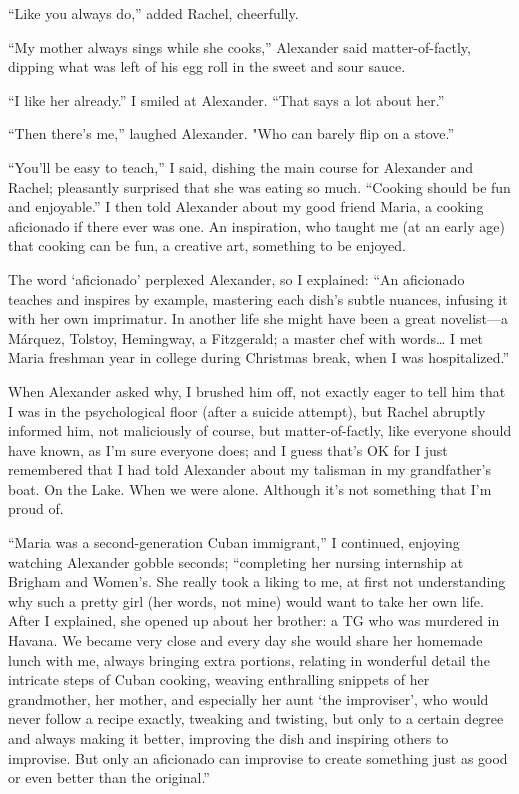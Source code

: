 ``Like you always do,'' added Rachel, cheerfully.

``My mother always sings while she cooks,'' Alexander said
matter-of-factly, dipping what was left of his egg roll in the sweet and
sour sauce.

``I like her already.'' I smiled at Alexander. ``That says a lot about
her.''

``Then there's me,'' laughed Alexander. "Who can barely flip on a
stove.''

``You'll be easy to teach,'' I said, dishing the main course for
Alexander and Rachel; pleasantly surprised that she was eating so much.
``Cooking should be fun and enjoyable.'' I then told Alexander about my
good friend Maria, a cooking aficionado if there ever was one. An
inspiration, who taught me (at an early age) that cooking can be fun, a
creative art, something to be enjoyed.

The word `aficionado' perplexed Alexander, so I explained: ``An
aficionado teaches and inspires by example, mastering each dish's subtle
nuances, infusing it with her own imprimatur. In another life she might
have been a great novelist---a Márquez, Tolstoy, Hemingway, a
Fitzgerald; a master chef with words\ldots{} I met Maria freshman year
in college during Christmas break, when I was hospitalized.''

When Alexander asked why, I brushed him off, not exactly eager to tell
him that I was in the psychological floor (after a suicide attempt), but
Rachel abruptly informed him, not maliciously of course, but
matter-of-factly, like everyone should have known, as I'm sure everyone
does; and I guess that's OK for I just remembered that I had told
Alexander about my talisman in my grandfather's boat. On the Lake. When
we were alone. Although it's not something that I'm proud of.

``Maria was a second-generation Cuban immigrant,'' I continued, enjoying
watching Alexander gobble seconds; ``completing her nursing internship
at Brigham and Women's. She really took a liking to me, at first not
understanding why such a pretty girl (her words, not mine) would want to
take her own life. After I explained, she opened up about her brother: a
TG who was murdered in Havana. We became very close and every day she
would share her homemade lunch with me, always bringing extra portions,
relating in wonderful detail the intricate steps of Cuban cooking,
weaving enthralling snippets of her grandmother, her mother, and
especially her aunt `the improviser', who would never follow a recipe
exactly, tweaking and twisting, but only to a certain degree and always
making it better, improving the dish and inspiring others to improvise.
But only an aficionado can improvise to create something just as good or
even better than the original.''

